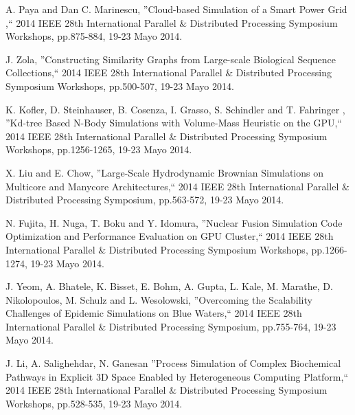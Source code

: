 \begin{thebibliography}{9}
A. Paya and Dan C. Marinescu, ''Cloud-based Simulation of a Smart Power Grid
,`` 2014 IEEE 28th International Parallel $\&$ Distributed Processing Symposium Workshops, pp.875-884, 19-23 Mayo 2014.

J. Zola, ''Constructing Similarity Graphs from Large-scale Biological Sequence Collections,`` 2014 IEEE 28th International Parallel $\&$ Distributed Processing Symposium Workshops, pp.500-507, 19-23 Mayo 2014.

K. Kofler, D. Steinhauser, B. Cosenza, I. Grasso, S. Schindler and T. Fahringer , ''Kd-tree Based N-Body Simulations with Volume-Mass Heuristic on the GPU,`` 2014 IEEE 28th International Parallel $\&$ Distributed Processing Symposium Workshops, pp.1256-1265, 19-23 Mayo 2014.

X. Liu and E. Chow, ''Large-Scale Hydrodynamic Brownian Simulations on Multicore and Manycore Architectures,`` 2014 IEEE 28th International Parallel $\&$ Distributed Processing Symposium, pp.563-572, 19-23 Mayo 2014.

N. Fujita, H. Nuga, T. Boku and Y. Idomura, ''Nuclear Fusion Simulation Code Optimization and Performance Evaluation on GPU Cluster,`` 2014 IEEE 28th International Parallel $\&$ Distributed Processing Symposium Workshops, pp.1266-1274, 19-23 Mayo 2014.

J. Yeom, A. Bhatele, K. Bisset, E. Bohm, A. Gupta, L. Kale, M. Marathe, D. Nikolopoulos, M. Schulz and L. Wesolowski, ''Overcoming the Scalability Challenges of Epidemic Simulations on Blue Waters,`` 2014 IEEE 28th International Parallel $\&$ Distributed Processing Symposium, pp.755-764, 19-23 Mayo 2014.

J. Li, A. Salighehdar, N. Ganesan ''Process Simulation of Complex Biochemical Pathways in Explicit 3D Space Enabled by Heterogeneous Computing Platform,`` 2014 IEEE 28th International Parallel $\&$ Distributed Processing Symposium Workshops, pp.528-535, 19-23 Mayo 2014.

\end{thebibliography}